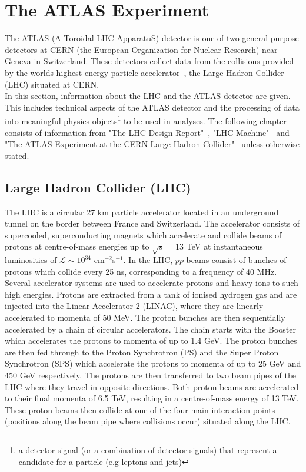 \section{The ATLAS Experiment}
The ATLAS (A Toroidal LHC ApparatuS) detector is one of two general purpose detectors at CERN (the European Organization for Nuclear Research) near Geneva in Switzerland. These detectors collect data from the collisions provided by the worlds highest energy particle accelerator~\cite{lhc-design-report}, the Large Hadron Collider (LHC) situated at CERN. \\

In this section, information about the LHC and the ATLAS detector are given. This includes technical aspects of the ATLAS detector and the processing of data into meaningful physics objects\footnote{a detector signal (or a combination of detector signals) that represent a candidate for a particle (e.g leptons and jets)} to be used in analyses. The following chapter consists of information from "The LHC Design Report"~\cite{lhc-design-report}, "LHC Machine"~\cite{Evans_2008} and "The ATLAS Experiment at the CERN Large Hadron Collider"~\cite{Collaboration_2008} unless otherwise stated.

\subsection{Large Hadron Collider (LHC)}
The LHC is a circular 27 km particle accelerator located in an underground tunnel on the border between France and Switzerland. The accelerator consists of supercooled, superconducting magnets which accelerate and collide beams of protons at centre-of-mass energies up to $\sqrt{s} = 13$ TeV at instantaneous luminosities of $\mathcal{L} \sim 10^{34}$ cm$^{-2}$s$^{-1}$. In the LHC, $pp$ beams consist of bunches of protons which collide every 25 ns, corresponding to a frequency of 40 MHz. Several accelerator systems are used to accelerate protons and heavy ions to such high energies. Protons are extracted from a tank of ionised hydrogen gas and are injected into the Linear Accelerator 2 (LINAC), where they are linearly accelerated to momenta of 50 MeV. The proton bunches are then sequentially accelerated by a chain of circular accelerators. The chain starts with the Booster which accelerates the protons to momenta of up to 1.4 GeV. The proton bunches are then fed through to the Proton Synchrotron (PS) and the Super Proton Synchrotron (SPS) which accelerate the protons to momenta of up to 25 GeV and 450 GeV respectively. The protons are then transferred to two beam pipes of the LHC where they travel in opposite directions. Both proton beams are accelerated to their final momenta of 6.5 TeV, resulting in a centre-of-mass energy of 13 TeV. These proton beams then collide at one of the four main interaction points (positions along the beam pipe where collisions occur) situated along the LHC. \\

